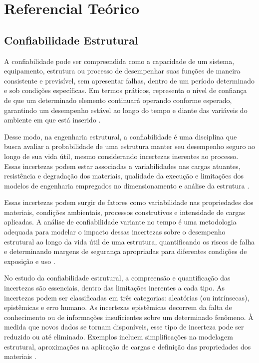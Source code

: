 \chapter{Referencial Teórico} \label{cap:referencial}

\section{Confiabilidade Estrutural}

A confiabilidade pode ser compreendida como a capacidade de um sistema, equipamento, estrutura ou processo de desempenhar suas funções de maneira consistente e previsível, sem apresentar falhas, dentro de um período determinado e sob condições específicas. Em termos práticos, representa o nível de confiança de que um determinado elemento continuará operando conforme esperado, garantindo um desempenho estável ao longo do tempo e diante das variáveis do ambiente em que está inserido \cite{melchers_structural_2017}.

Desse modo, na engenharia estrutural, a confiabilidade é uma disciplina que busca avaliar a probabilidade de uma estrutura manter seu desempenho seguro ao longo de sua vida útil, mesmo considerando incertezas inerentes ao processo. Essas incertezas podem estar associadas a variabilidades nas cargas atuantes, resistência e degradação dos materiais, qualidade da execução e limitações dos modelos de engenharia empregados no dimensionamento e análise da estrutura \cite{melchers_structural_2017, du_structural_2023}.

Essas incertezas podem surgir de fatores como variabilidade nas propriedades dos materiais, condições ambientais, processos construtivos e intensidade de cargas aplicadas. A análise de confiabilidade variante no tempo é uma metodologia adequada para modelar o impacto dessas incertezas sobre o desempenho estrutural ao longo da vida útil de uma estrutura, quantificando os riscos de falha e determinando margens de segurança apropriadas para diferentes condições de exposição e uso \cite{melchers_structural_2017, du_structural_2023, pereira_junior_reliability_2023}.

No estudo da confiabilidade estrutural, a compreensão e quantificação das incertezas são essenciais, dentro das limitações inerentes a cada tipo. As incertezas podem ser classificadas em três categorias: aleatórias (ou intrínsecas), epistêmicas e erro humano. As incertezas epistêmicas decorrem da falta de conhecimento ou de informações insuficientes sobre um determinado fenômeno. À medida que novos dados se tornam disponíveis, esse tipo de incerteza pode ser reduzido ou até eliminado. Exemplos incluem simplificações na modelagem estrutural, aproximações na aplicação de cargas e definição das propriedades dos materiais \cite{du_structural_2023}.

